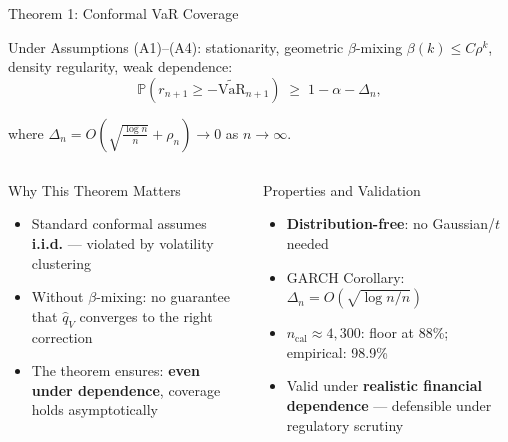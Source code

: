 \documentclass[9pt, aspectratio=169, t]{beamer}
\newcommand{\VaR}{\mathrm{VaR}}
\newcommand{\qV}{\hat{q}_V}
\renewcommand{\P}{\mathbb{P}}
\begin{document}
\begin{frame}{Theorem 1: Conformal VaR Coverage}
	\vspace{-0.2cm}
	{\small
	\begin{thm}
	Under Assumptions (A1)--(A4): stationarity, geometric $\beta$-mixing $\beta(k) \leq C\rho^k$, density regularity, weak dependence:
	\vspace{-2mm}
	\[
		\P\!\left(r_{n+1} \geq -\widetilde{\VaR}_{n+1}\right)
		\;\geq\;
		1 - \alpha - \Delta_n,
	\]
	\vspace{-4mm}

	where $\Delta_n = O\!\left(\sqrt{\tfrac{\log n}{n}} + \rho_n\right) \to 0$ as $n\to\infty$.
	\end{thm}
	}
	{\footnotesize
	\begin{columns}[T]
		\begin{alertblock}{Why This Theorem Matters}
		\begin{itemize}\setlength{\itemsep}{2pt}
			\item Standard conformal assumes \textbf{i.i.d.} --- violated by volatility clustering
			\item Without $\beta$-mixing: no guarantee that $\qV$ converges to the right correction
			\item The theorem ensures: \textbf{even under dependence}, coverage holds asymptotically
		\end{itemize}
		\end{alertblock}

		\begin{block}{Properties and Validation}
		\begin{itemize}\setlength{\itemsep}{2pt}
			\item \textbf{Distribution-free}: no Gaussian/$t$ needed
			\item GARCH Corollary: $\Delta_n = O(\sqrt{\log n/n})$
			\item $n_{\mathrm{cal}} \approx 4{,}300$: floor at 88\%; empirical: 98.9\%
			\item Valid under \textbf{realistic financial dependence} --- defensible under regulatory scrutiny
		\end{itemize}
		\end{block}
	\end{columns}
	}
\end{frame}
\end{document}
